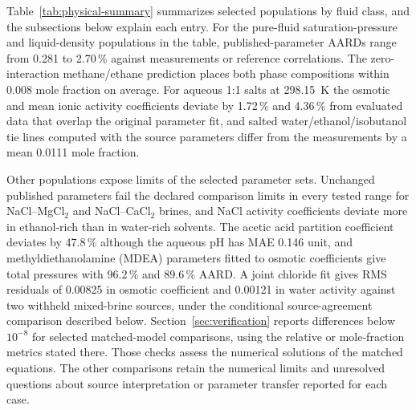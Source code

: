 Table~\ref{tab:physical-summary} summarizes selected populations by fluid class, and the subsections below explain each entry.
For the pure-fluid saturation-pressure and liquid-density populations in the table, published-parameter AARDs range from 0.281 to 2.70\,\% against measurements or reference correlations.
The zero-interaction methane/ethane prediction places both phase compositions within 0.008 mole fraction on average.
For aqueous 1:1 salts at 298.15~K the osmotic and mean ionic activity coefficients deviate by 1.72\,\% and 4.36\,\% from evaluated data that overlap the original parameter fit, and salted water/ethanol/isobutanol tie lines computed with the source parameters differ from the measurements by a mean 0.0111 mole fraction.

Other populations expose limits of the selected parameter sets.
Unchanged published parameters fail the declared comparison limits in every tested range for NaCl--MgCl$_2$ and NaCl--CaCl$_2$ brines, and NaCl activity coefficients deviate more in ethanol-rich than in water-rich solvents.
The acetic acid partition coefficient deviates by 47.8\,\% although the aqueous pH has MAE 0.146 unit, and methyldiethanolamine (MDEA) parameters fitted to osmotic coefficients give total pressures with 96.2\,\% and 89.6\,\% AARD.
A joint chloride fit gives RMS residuals of 0.00825 in osmotic coefficient and 0.00121 in water activity against two withheld mixed-brine sources, under the conditional source-agreement comparison described below.
Section~\ref{sec:verification} reports differences below $10^{-8}$ for selected matched-model comparisons, using the relative or mole-fraction metrics stated there.
Those checks assess the numerical solutions of the matched equations.
The other comparisons retain the numerical limits and unresolved questions about source interpretation or parameter transfer reported for each case.



